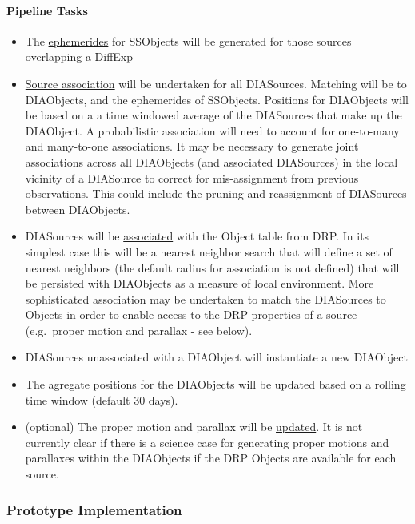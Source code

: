 \paragraph{Pipeline Tasks}
\begin{itemize}
\item The \hyperref[sec:acEphemerisCalculation]{ephemerides} for SSObjects will be generated for those sources overlapping a DiffExp
\item \hyperref[sec:acDIAObjectGeneration]{Source association} will be undertaken for all DIASources. Matching will be to DIAObjects, and the ephemerides of SSObjects. Positions for DIAObjects will be based on a a time windowed average of the DIASources that make up the DIAObject. A probabilistic association will need to account for one-to-many and many-to-one associations. It may be necessary to generate joint associations across all DIAObjects (and associated DIASources) in the local  vicinity of a DIASource to correct for mis-assignment from previous observations. This could include the pruning and reassignment of DIASources between DIAObjects.
\item DIASources will be \hyperref[sec:acDIAObjectGeneration]{associated} with the Object table from DRP. In its simplest case this will be a nearest neighbor search that will define a set of nearest neighbors (the default radius for association is not defined) that will be persisted with DIAObjects as a measure of local environment. More sophisticated association may be undertaken to match the DIASources to Objects in order to enable access to the DRP properties of a source (e.g.\ proper motion and parallax - see below).
\item DIASources unassociated with a DIAObject will instantiate a new DIAObject
\item The agregate positions for the DIAObjects will be updated based on a rolling time window (default 30 days). 
\item (optional) The proper motion and parallax will be \hyperref[sec:acStellarMotionFitting]{updated}. It is not currently clear if there is a science case for generating proper motions and parallaxes within the DIAObjects if the DRP Objects are available for each source. 
\end{itemize}


\subsubsection{Prototype Implementation}

